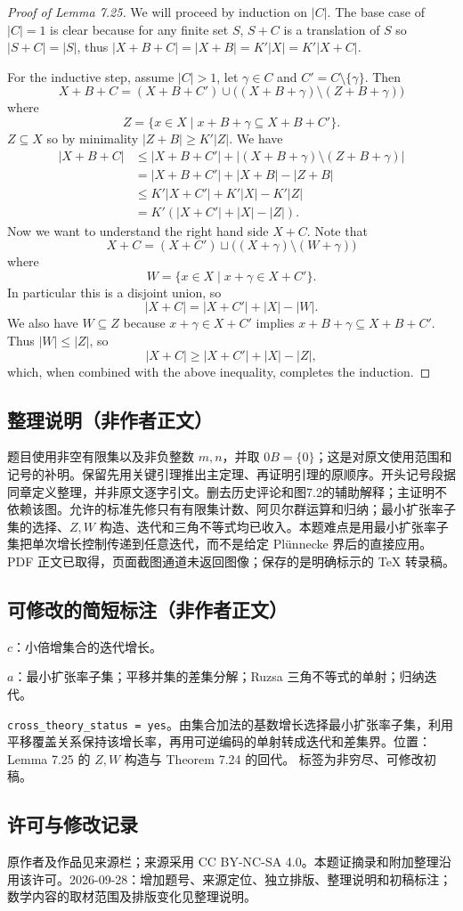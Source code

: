 \documentclass[UTF8,11pt]{ctexart}
\theoremstyle{definition}
\begin{document}
\begin{proof}[Proof of Lemma 7.25]
We will proceed by induction on $|C|$. The base case of $|C|=1$ is clear because for any finite set $S$, $S+C$ is a translation of $S$ so $|S+C|=|S|$, thus $|X+B+C|=|X+B|=K'|X|=K'|X+C|$.

For the inductive step, assume $|C|>1$, let $\gamma\in C$ and $C'=C\setminus\{\gamma\}$. Then
\[X+B+C=(X+B+C')\cup\bigl((X+B+\gamma)\setminus(Z+B+\gamma)\bigr)\]
where
\[Z=\{x\in X\mid x+B+\gamma\subseteq X+B+C'\}.\]
$Z\subseteq X$ so by minimality $|Z+B|\geq K'|Z|$. We have
\begin{align*}
|X+B+C|&\leq |X+B+C'|+|(X+B+\gamma)\setminus(Z+B+\gamma)|\\
&=|X+B+C'|+|X+B|-|Z+B|\\
&\leq K'|X+C'|+K'|X|-K'|Z|\\
&=K'(|X+C'|+|X|-|Z|).
\end{align*}
Now we want to understand the right hand side $X+C$. Note that
\[X+C=(X+C')\sqcup\bigl((X+\gamma)\setminus(W+\gamma)\bigr)\]
where
\[W=\{x\in X\mid x+\gamma\in X+C'\}.\]
In particular this is a disjoint union, so
\[|X+C|=|X+C'|+|X|-|W|.\]
We also have $W\subseteq Z$ because $x+\gamma\in X+C'$ implies $x+B+\gamma\subseteq X+B+C'$. Thus $|W|\leq|Z|$, so
\[|X+C|\geq |X+C'|+|X|-|Z|,\]
which, when combined with the above inequality, completes the induction.
\end{proof}
\subsection*{整理说明（非作者正文）}
题目使用非空有限集以及非负整数 $m,n$，并取 $0B=\{0\}$；这是对原文使用范围和记号的补明。保留先用关键引理推出主定理、再证明引理的原顺序。开头记号段据同章定义整理，并非原文逐字引文。删去历史评论和图7.2的辅助解释；主证明不依赖该图。允许的标准先修只有有限集计数、阿贝尔群运算和归纳；最小扩张率子集的选择、$Z,W$ 构造、迭代和三角不等式均已收入。本题难点是用最小扩张率子集把单次增长控制传递到任意迭代，而不是给定 Pl\"unnecke 界后的直接应用。PDF 正文已取得，页面截图通道未返回图像；保存的是明确标示的 TeX 转录稿。
\subsection*{可修改的简短标注（非作者正文）}
$c$：小倍增集合的迭代增长。

$a$：最小扩张率子集；平移并集的差集分解；Ruzsa 三角不等式的单射；归纳迭代。

\texttt{cross\_theory\_status = yes}。由集合加法的基数增长选择最小扩张率子集，利用平移覆盖关系保持该增长率，再用可逆编码的单射转成迭代和差集界。位置：Lemma 7.25 的 $Z,W$ 构造与 Theorem 7.24 的回代。
标签为非穷尽、可修改初稿。
\subsection*{许可与修改记录}
原作者及作品见来源栏；来源采用 CC BY-NC-SA 4.0。本题证摘录和附加整理沿用该许可。2026-09-28：增加题号、来源定位、独立排版、整理说明和初稿标注；数学内容的取材范围及排版变化见整理说明。
\end{document}
